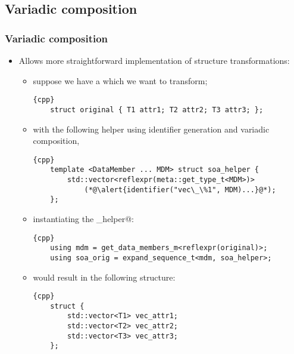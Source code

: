 \documentclass[compress,table,xcolor=table]{beamer}
\begin{document}
\subsection{Variadic composition}
\begin{frame}[fragile]
\frametitle{Variadic composition}
  \scriptsize
  \begin{itemize}
    \item Allows more straightforward implementation of structure transformations:
    \begin{itemize}
      \item suppose we have a \verb@struct@ which we want to transform;
      \begin{lstlisting}{cpp}
	struct original { T1 attr1; T2 attr2; T3 attr3; };
      \end{lstlisting}
      \item with the following helper using identifier generation and variadic
        composition,
      \begin{lstlisting}{cpp}
	template <DataMember ... MDM> struct soa_helper {
	    std::vector<reflexpr(meta::get_type_t<MDM>)>
	        (*@\alert{identifier("vec\_\%1", MDM)...}@*);
	};
      \end{lstlisting}
      \item instantiating the \verb@soa_helper@:
      \begin{lstlisting}{cpp}
	using mdm = get_data_members_m<reflexpr(original)>;
	using soa_orig = expand_sequence_t<mdm, soa_helper>;
      \end{lstlisting}
      \item would result in the following structure:
      \begin{lstlisting}{cpp}
	struct {
	    std::vector<T1> vec_attr1;
	    std::vector<T2> vec_attr2;
	    std::vector<T3> vec_attr3;
	};
      \end{lstlisting}
    \end{itemize}
  \end{itemize}
\end{frame}
\end{document}
